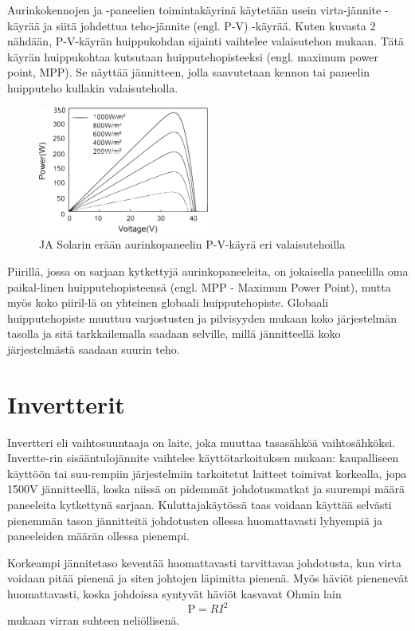   Aurinkokennojen ja -paneelien toimintakäyrinä käytetään usein virta-jännite -käyrää ja siitä johdettua teho-jännite (engl. P-V) -käyrää. Kuten kuvasta 2 nähdään, P-V-käyrän huippukohdan sijainti vaihtelee valaisutehon mukaan. Tätä käyrän huippukohtaa kutsutaan huipputehopisteeksi (engl. maximum power point, MPP). Se näyttää jännitteen, jolla saavutetaan kennon tai paneelin huipputeho kullakin valaisuteholla.
  \begin{figure}
    \centering
    \includegraphics[width=0.5\textwidth]{figures/pvcurve}
    \caption{JA Solarin erään aurinkopaneelin P-V-käyrä eri valaisutehoilla}
  \end{figure}
  Piirillä, jossa on sarjaan kytkettyjä aurinkopaneeleita, on jokaisella paneelilla oma paikal-linen huipputehopisteensä (engl. MPP - Maximum Power Point), mutta myös koko piiril-lä on yhteinen globaali huipputehopiste. Globaali huipputehopiste muuttuu varjostusten ja pilvisyyden mukaan koko järjestelmän tasolla ja sitä tarkkailemalla saadaan selville, millä jännitteellä koko järjestelmästä saadaan suurin teho.

\section{Invertterit}
  Invertteri eli vaihtosuuntaaja on laite, joka muuttaa tasasähköä vaihtosähköksi. Invertte-rin sisääntulojännite vaihtelee käyttötarkoituksen mukaan: kaupalliseen käyttöön tai suu-rempiin järjestelmiin tarkoitetut laitteet toimivat korkealla, jopa 1500V jännitteellä, koska niissä on pidemmät johdotusmatkat ja suurempi määrä paneeleita kytkettynä sarjaan. Kuluttajakäytössä taas voidaan käyttää selvästi pienemmän tason jännitteitä johdotusten ollessa huomattavasti lyhyempiä ja paneeleiden määrän ollessa pienempi. 

  Korkeampi jännitetaso keventää huomattavasti tarvittavaa johdotusta, kun virta voidaan pitää pienenä ja siten johtojen läpimitta pienenä. Myös häviöt pienenevät huomattavasti, koska johdoissa syntyvät häviöt kasvavat Ohmin lain 
  \begin{equation}
    \textrm{P} = RI^2
  \end{equation}
  mukaan virran suhteen neliöllisenä.

